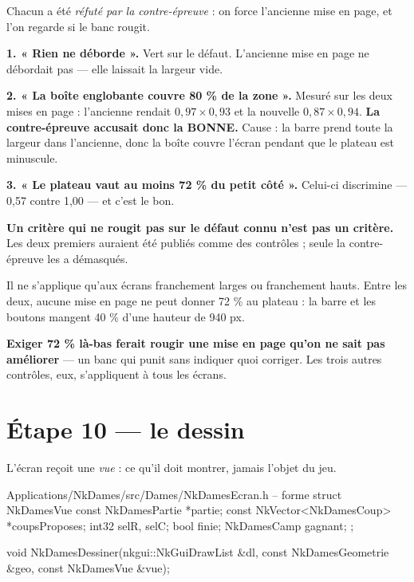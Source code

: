 \begin{nkpiege}
Chacun a été \emph{réfuté par la contre-épreuve} : on force l'ancienne mise en
page, et l'on regarde si le banc rougit.

\textbf{1. « Rien ne déborde ».} Vert sur le défaut. L'ancienne mise en page ne
débordait pas --- elle laissait la largeur vide.

\textbf{2. « La boîte englobante couvre 80 \% de la zone ».} Mesuré sur les deux
mises en page : l'ancienne rendait $0{,}97 \times 0{,}93$ et la nouvelle
$0{,}87 \times 0{,}94$. \textbf{La contre-épreuve accusait donc la BONNE.} Cause :
la barre prend toute la largeur dans l'ancienne, donc la boîte couvre l'écran
pendant que le plateau est minuscule.

\textbf{3. « Le plateau vaut au moins 72 \% du petit côté ».} Celui-ci
discrimine --- 0,57 contre 1,00 --- et c'est le bon.

\alerte{} \textbf{Un critère qui ne rougit pas sur le défaut connu n'est pas un critère.}
Les deux premiers auraient été publiés comme des contrôles ; seule la
contre-épreuve les a démasqués.
\end{nkpiege}

\begin{nkretenir}
Il ne s'applique qu'aux écrans franchement larges ou franchement hauts. Entre les
deux, aucune mise en page ne peut donner 72 \% au plateau : la barre et les
boutons mangent 40 \% d'une hauteur de 940 px.

\textbf{Exiger 72 \% là-bas ferait rougir une mise en page qu'on ne sait pas
améliorer} --- un banc qui punit sans indiquer quoi corriger. Les trois autres
contrôles, eux, s'appliquent à tous les écrans.
\end{nkretenir}

\section{Étape 10 --- le dessin}

L'écran reçoit une \emph{vue} : ce qu'il doit montrer, jamais l'objet du jeu.

\begin{nkcode}{Applications/NkDames/src/Dames/NkDamesEcran.h -- forme}
struct NkDamesVue {
        const NkDamesPartie *partie;
        const NkVector<NkDamesCoup> *coupsProposes;
        int32 selR, selC;
        bool finie;
        NkDamesCamp gagnant;
};

void NkDamesDessiner(nkgui::NkGuiDrawList &dl, const NkDamesGeometrie &geo,
                     const NkDamesVue &vue);
\end{nkcode}

